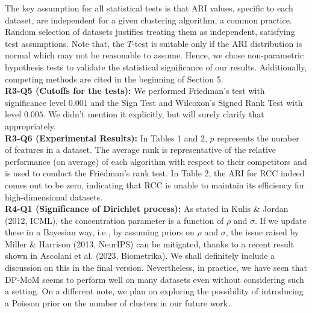\documentclass{article}
\begin{document}
The key assumption for all statistical tests is that ARI values, specific to each dataset, are independent for a given clustering algorithm, a common practice. Random selection of datasets justifies treating them as independent, satisfying test assumptions. Note that, the $T$-test is suitable only if the ARI distribution is normal which may not be reasonable to assume. Hence, we chose non-parametric hypothesis tests to validate the statistical significance of our results. Additionally, competing methods are cited in the beginning of Section 5.\\
\textbf{R3-Q5 (Cutoffs for the tests):} We performed Friedman's test with significance level $0.001$ and the Sign Test and Wilcoxon's Signed Rank Test with level $0.005$. We didn't mention it explicitly, but will surely clarify that appropriately.\\
\textbf{R3-Q6 (Experimental Results):} In Tables 1 and 2, $p$ represents the number of features in a dataset. The average rank is representative of the relative performance (on average) of each algorithm with respect to their competitors and is used to conduct the Friedman's rank test. In Table 2, the ARI for RCC indeed comes out to be zero, indicating that RCC is unable to maintain its efficiency for high-dimensional datasets.\\
\textbf{R4-Q1 (Significance of Dirichlet process):} As stated in Kulis \& Jordan (2012, ICML), the concentration parameter is a function of $\rho$ and $\sigma$. If we update these in a Bayesian way, i.e., by assuming priors on $\rho$ and $\sigma$, the issue raised by Miller \& Harrison (2013, NeurIPS) can be mitigated, thanks to a recent result shown in Ascolani et al. (2023, Biometrika). We shall definitely include a discussion on this in the final version. Nevertheless, in practice, we have seen that DP-MoM seems to perform well on many datasets even without considering such a setting. On a different note, we plan on exploring the possibility of introducing a Poisson prior on the number of clusters in our future work.\\
\end{document}

